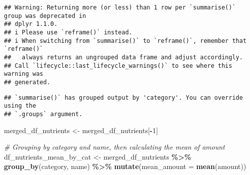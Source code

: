 \documentclass[
]{article}
\newenvironment{Shaded}{\begin{snugshade}}{\end{snugshade}}
\newcommand{\AttributeTok}[1]{\textcolor[rgb]{0.13,0.29,0.53}{#1}}
\newcommand{\CommentTok}[1]{\textcolor[rgb]{0.56,0.35,0.01}{\textit{#1}}}
\newcommand{\ConstantTok}[1]{\textcolor[rgb]{0.56,0.35,0.01}{#1}}
\newcommand{\DecValTok}[1]{\textcolor[rgb]{0.00,0.00,0.81}{#1}}
\newcommand{\FunctionTok}[1]{\textcolor[rgb]{0.13,0.29,0.53}{\textbf{#1}}}
\newcommand{\NormalTok}[1]{#1}
\newcommand{\OtherTok}[1]{\textcolor[rgb]{0.56,0.35,0.01}{#1}}
\newcommand{\SpecialCharTok}[1]{\textcolor[rgb]{0.81,0.36,0.00}{\textbf{#1}}}
\newcommand{\StringTok}[1]{\textcolor[rgb]{0.31,0.60,0.02}{#1}}
\begin{document}
\begin{verbatim}
## Warning: Returning more (or less) than 1 row per `summarise()` group was deprecated in
## dplyr 1.1.0.
## i Please use `reframe()` instead.
## i When switching from `summarise()` to `reframe()`, remember that `reframe()`
##   always returns an ungrouped data frame and adjust accordingly.
## Call `lifecycle::last_lifecycle_warnings()` to see where this warning was
## generated.
\end{verbatim}

\begin{verbatim}
## `summarise()` has grouped output by 'category'. You can override using the
## `.groups` argument.
\end{verbatim}

\begin{Shaded}
\begin{Highlighting}[]
\NormalTok{merged\_df\_nutrients }\OtherTok{\textless{}{-}}\NormalTok{ merged\_df\_nutrients[}\SpecialCharTok{{-}}\DecValTok{1}\NormalTok{]}
\end{Highlighting}
\end{Shaded}

\begin{Shaded}
\end{Shaded}

\begin{Shaded}
\begin{Highlighting}[]
\CommentTok{\# Grouping by \textquotesingle{}category\textquotesingle{} and \textquotesingle{}name\textquotesingle{}, then calculating the mean of \textquotesingle{}amount\textquotesingle{}}
\NormalTok{df\_nutrients\_mean\_by\_cat }\OtherTok{\textless{}{-}}\NormalTok{ merged\_df\_nutrients }\SpecialCharTok{\%\textgreater{}\%}
  \FunctionTok{group\_by}\NormalTok{(category, name) }\SpecialCharTok{\%\textgreater{}\%}
  \FunctionTok{mutate}\NormalTok{(}\AttributeTok{mean\_amount =} \FunctionTok{mean}\NormalTok{(amount))}
\end{Highlighting}
\end{Shaded}
\end{document}

